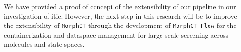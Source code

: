 We have provided a proof of concept of the extensibility of our pipeline
in our investigation of \gls{itic}. However, the next step in this research
will be to improve the extensibility of \texttt{MorphCT} through the development
of \texttt{MorphCT-Flow} for the containerization and dataspace management for
large scale screening across molecules and state spaces. 











